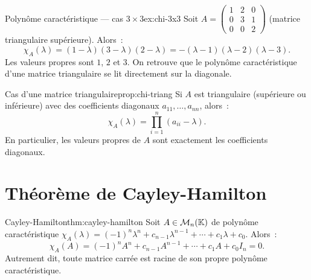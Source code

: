\begin{example}{Polynôme caractéristique --- cas $3\times 3$}{ex:chi-3x3}
  Soit $A=\begin{pmatrix}1&2&0\\0&3&1\\0&0&2\end{pmatrix}$
  (matrice triangulaire supérieure).
  Alors~:
  \[
    \chi_A(\lambda)=(1-\lambda)(3-\lambda)(2-\lambda)
    =-(\lambda-1)(\lambda-2)(\lambda-3).
  \]
  Les valeurs propres sont $1$, $2$ et $3$. On retrouve que le polynôme
  caractéristique d'une matrice triangulaire se lit directement sur la
  diagonale.
\end{example}

\begin{proposition}{Cas d'une matrice triangulaire}{prop:chi-triang}
  Si $A$ est triangulaire (supérieure ou inférieure) avec des
  coefficients diagonaux $a_{11},\ldots,a_{nn}$, alors~:
  \[
    \chi_A(\lambda)=\prod_{i=1}^n(a_{ii}-\lambda).
  \]
  En particulier, les valeurs propres de $A$ sont exactement les
  coefficients diagonaux.
\end{proposition}

\section{Théorème de Cayley-Hamilton}\label{sec:cayley-hamilton}

\begin{theorem}{Cayley-Hamilton}{thm:cayley-hamilton}
  Soit $A\in\mathcal{M}_n({\mathbb{K}})$ de polynôme caractéristique
  $\chi_A(\lambda)=(-1)^n\lambda^n+c_{n-1}\lambda^{n-1}+\cdots+c_1\lambda+c_0$.
  Alors~:
  \[
    \chi_A(A)=(-1)^n A^n+c_{n-1}A^{n-1}+\cdots+c_1 A+c_0 I_n=0.
  \]
  Autrement dit, toute matrice carrée est racine de son propre polynôme
  caractéristique.
\end{theorem}

